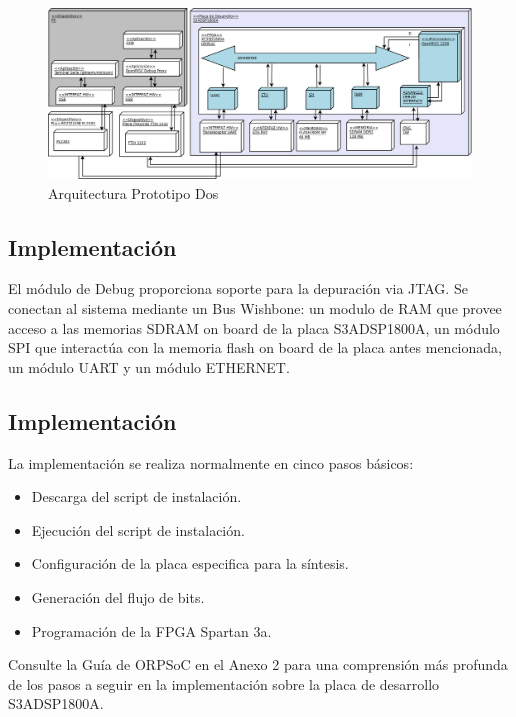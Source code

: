 		\begin{figure}[!h]
 		\begin{center}
  		\includegraphics[width=1\textwidth,keepaspectratio=true]{./images/orpsoc}
  		\caption{Arquitectura Prototipo Dos}
  		\label{fig:orpsoc} 
 		\end{center}
		\end{figure}
	
		\subsection{Implementación}

		El módulo de Debug proporciona soporte para la depuración via JTAG. Se conectan al sistema mediante un Bus Wishbone: un modulo de RAM que provee
		acceso a las memorias SDRAM on board de la placa S3ADSP1800A, un módulo SPI que interactúa con la memoria flash on board
		de la placa antes mencionada, un módulo UART y un módulo ETHERNET. 

		\subsection{Implementación}
		La implementación se realiza normalmente en cinco pasos básicos: 
		\begin {itemize}
		\item Descarga del script de instalación.
		\item Ejecución del script de instalación.
		\item Configuración de la placa especifica para la síntesis.
		\item Generación del flujo de bits.
		\item Programación de la FPGA Spartan 3a.
 		\end {itemize}
 
 Consulte la Guía de ORPSoC en el Anexo 2 para una comprensión más profunda de los pasos a seguir en la implementación sobre la placa de desarrollo
 S3ADSP1800A.
		
